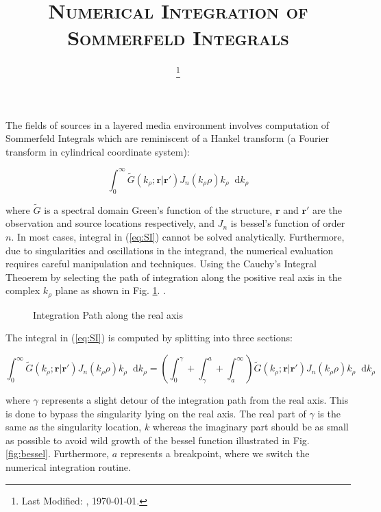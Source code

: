 \documentclass[11pt]{article}
\renewcommand{\v}[1]{\mathbf{#1}} %
\newcommand{\ti}[1]{\tilde{#1}} %
\newcommand{\p}{\rho}  %
\renewcommand{\inf}{\infty}  %
\renewcommand{\^}{\hat}  %
\newcommand*\diff{\mathop{}\!\mathrm{d}} %
\begin{document}
  \title{\textsc{Numerical Integration of Sommerfeld Integrals}\\}
  \date{\footnote{Last Modified: \currenttime, \today.}}
  \maketitle

  The fields of sources in a layered media environment involves computation of Sommerfeld Integrals which are reminiscent of a Hankel transform (a Fourier transform in cylindrical coordinate system):

  \begin{equation}
    \int_{0}^{\inf} \ti{G}(k_{\p}; \v{r}|\v{r}') J_n(k_{\p} \p) k_{\p} \diff{k_{\p}}
    \label{eq:SI}
  \end{equation}

  where $\ti{G}$ is a spectral domain Green's function of the structure, $\v{r}$ and $\v{r}'$ are the observation and source locations respectively, and $J_n$ is bessel's function of order $n$. In most cases, integral in (\ref{eq:SI}) cannot be solved analytically. Furthermore, due to singularities and oscillations in the integrand, the numerical evaluation  requires careful manipulation and techniques. Using the Cauchy's Integral Theoerem \cite[p. 377]{arfken2001mathematical} by selecting the path of integration along the positive real axis in the complex $k_{\p}$ plane as shown in Fig. \ref{fig:path}. \cite{golubovic2012efficient,michalski2016efficient}.

  \begin{figure}[h!]
    \centering
    
    \caption{Integration Path along the real axis}
    \label{fig:path}
  \end{figure}

The integral in (\ref{eq:SI}) is computed by splitting into three sections:

\begin{equation}
  \int_{0}^{\inf} \ti{G}(k_{\p}; \v{r}|\v{r}') J_n(k_{\p} \p) k_{\p} \diff{k_{\p}} = \left(\int_{0}^{\gamma} + \int_{\gamma}^{a} + \int_{a}^{\inf} \right)
  \ti{G}(k_{\p}; \v{r}|\v{r}') J_n(k_{\p} \p) k_{\p} \diff{k_{\p}}
  \label{eq:SI_split}
\end{equation}

where $\gamma$ represents a slight detour of the integration path from the real axis. This is done to bypass the singularity lying on the real axis. The real part of $\gamma$ is the same as the singularity location, $k$ whereas the imaginary part should be as small as possible to avoid wild growth of the bessel function illustrated in Fig. \ref{fig:bessel}. Furthermore, $a$ represents a breakpoint, where we switch the numerical integration routine.
\end{document}
